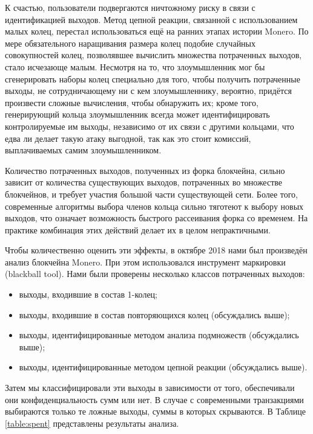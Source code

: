 \documentclass{mrl}
\begin{document}
К счастью, пользователи подвергаются ничтожному риску в связи с идентификацией выходов. Метод цепной реакции, связанной с использованием малых колец, перестал использоваться ещё на ранних этапах истории Monero. По мере обязательного наращивания размера колец подобие случайных совокупностей колец, позволявшее вычислить множества потраченных выходов, стало исчезающе малым. Несмотря на то, что злоумышленник мог бы сгенерировать наборы колец специально для того, чтобы получить потраченные выходы, не сотрудничающему ни с кем злоумышленнику, вероятно, придётся произвести сложные вычисления, чтобы обнаружить их; кроме того, генерирующий кольца злоумышленник всегда может идентифицировать контролируемые им выходы, независимо от их связи с другими кольцами, что едва ли делает такую атаку выгодной, так как это стоит комиссий, выплачиваемых самим злоумышленником.

Количество потраченных выходов, полученных из форка блокчейна, сильно зависит от количества существующих выходов, потраченных во множестве блокчейнов, и требует участия большой части существующей сети. Более того, современные алгоритмы выбора членов кольца сильно тяготеют к выбору новых выходов, что означает возможность быстрого рассеивания форка со временем. На практике комбинация этих действий делает их в целом непрактичными.

Чтобы количественно оценить эти эффекты, в октябре 2018 нами был произведён анализ блокчейна Monero. При этом использовался инструмент маркировки (blackball tool). Нами были проверены несколько классов потраченных выходов:
\begin{itemize}
\item выходы, входившие в состав 1-колец;
\item выходы, входившие в состав повторяющихся колец (обсуждались выше);
\item выходы, идентифицированные методом анализа подмножеств (обсуждались выше);
\item выходы, идентифицированные методом цепной реакции (обсуждались выше).
\end{itemize}
Затем мы классифицировали эти выходы в зависимости от того, обеспечивали они конфиденциальность сумм или нет. В случае с современными транзакциями выбираются только те ложные выходы, суммы в которых скрываются. В Таблице \ref{table:spent} представлены результаты анализа.
\end{document}
